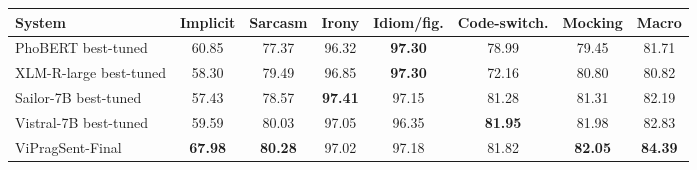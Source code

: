 \small
\setlength{\tabcolsep}{3pt}
\begin{tabular}{lccccccc}
\toprule
System & Implicit & Sarcasm & Irony & Idiom/fig. & Code-switch. & Mocking & Macro \\
\midrule
PhoBERT best-tuned & 60.85 & 77.37 & 96.32 & \textbf{97.30} & 78.99 & 79.45 & 81.71 \\
XLM-R-large best-tuned & 58.30 & 79.49 & 96.85 & \textbf{97.30} & 72.16 & 80.80 & 80.82 \\
Sailor-7B best-tuned & 57.43 & 78.57 & \textbf{97.41} & 97.15 & 81.28 & 81.31 & 82.19 \\
Vistral-7B best-tuned & 59.59 & 80.03 & 97.05 & 96.35 & \textbf{81.95} & 81.98 & 82.83 \\
\midrule
ViPragSent-Final & \textbf{67.98} & \textbf{80.28} & 97.02 & 97.18 & 81.82 & \textbf{82.05} & \textbf{84.39} \\
\bottomrule
\end{tabular}%
